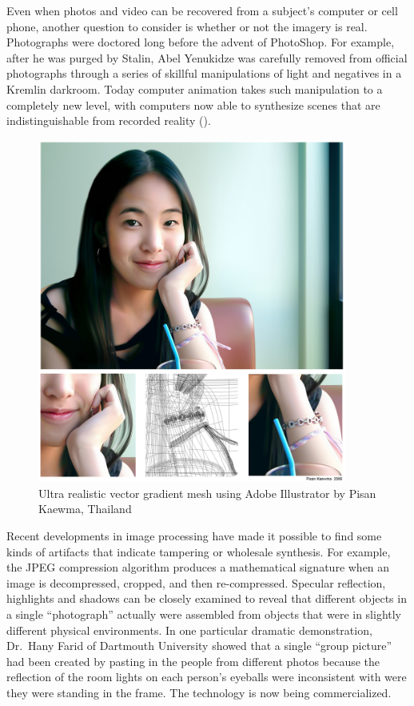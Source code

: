 Even when photos and video can be recovered from a subject's computer
or cell phone, another question to consider is whether or not the
imagery is real. Photographs were doctored long before the advent of
PhotoShop. For example, after he was purged by Stalin, Abel
Yenukidze was carefully removed from official photographs through a
series of skillful manipulations of light and negatives in a Kremlin darkroom\citet{stalins-darkroom}. Today
computer animation takes such manipulation to a completely new level,
with computers now able to synthesize scenes that are 
indistinguishable from recorded reality (). 

\begin{figure}
\includegraphics[width=4in]{art/a1336.jpg}
\caption{Ultra realistic vector gradient mesh using Adobe Illustrator by Pisan Kaewma, Thailand}\label{ultra-realistic}
\end{figure}

Recent developments in image processing have made it
possible to find some kinds of artifacts that indicate tampering or wholesale synthesis. For example,
the JPEG compression algorithm produces a mathematical signature when an
image is decompressed, cropped, and then re-compressed. Specular 
reflection, highlights and shadows can be closely examined to reveal
that different objects in a single ``photograph'' actually were
assembled from objects that were in 
slightly different physical environments. In one particular dramatic
demonstration, Dr.\ Hany Farid of Dartmouth University showed that a single ``group picture''
had been created by pasting in the people from different photos
because the reflection of the room lights on each person's eyeballs
were inconsistent with were they were standing in the frame. The technology is now
being commercialized\citep{farid07}.


